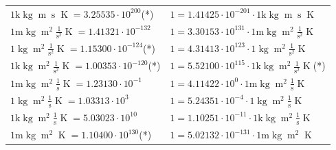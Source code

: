 \begin{center}
\begin{longtable}{l l}
{\color{gray}$1 \bm{\mathrm{ k}}\operatorname{kg}{\operatorname{m}}{\operatorname{s}}{}{\operatorname{K}} = 3.25535\cdot10^{200} $}\quad(*) & {\color{gray}$ 1 = 1.41425\cdot10^{-201} \cdot 1 \bm{\mathrm{ k}}\operatorname{kg}{\operatorname{m}}{\operatorname{s}}{}{\operatorname{K}}$}  \\
{\color{gray}$1 \bm{\mathrm{ m}}\operatorname{kg}{\operatorname{m}^2}\frac1{\operatorname{s}^2}{}{\operatorname{K}} = 1.41321\cdot10^{-132} $}   & {\color{gray}$ 1 = 3.30153\cdot10^{131} \cdot 1 \bm{\mathrm{ m}}\operatorname{kg}{\operatorname{m}^2}\frac1{\operatorname{s}^2}{}{\operatorname{K}}$}  \\
{\color{black}$1 \bm{\mathrm{ }}\operatorname{kg}{\operatorname{m}^2}\frac1{\operatorname{s}^2}{}{\operatorname{K}} = 1.15300\cdot10^{-124} $}\quad(*) & {\color{black}$ 1 = 4.31413\cdot10^{123} \cdot 1 \bm{\mathrm{ }}\operatorname{kg}{\operatorname{m}^2}\frac1{\operatorname{s}^2}{}{\operatorname{K}}$}  \\
{\color{gray}$1 \bm{\mathrm{ k}}\operatorname{kg}{\operatorname{m}^2}\frac1{\operatorname{s}^2}{}{\operatorname{K}} = 1.00353\cdot10^{-120} $}\quad(*) & {\color{gray}$ 1 = 5.52100\cdot10^{115} \cdot 1 \bm{\mathrm{ k}}\operatorname{kg}{\operatorname{m}^2}\frac1{\operatorname{s}^2}{}{\operatorname{K}}$}\quad(*)\\
{\color{gray}$1 \bm{\mathrm{ m}}\operatorname{kg}{\operatorname{m}^2}\frac1{\operatorname{s}}{}{\operatorname{K}} = 1.23130\cdot10^{-1} $}   & {\color{gray}$ 1 = 4.11422\cdot10^{0} \cdot 1 \bm{\mathrm{ m}}\operatorname{kg}{\operatorname{m}^2}\frac1{\operatorname{s}}{}{\operatorname{K}}$}  \\
{\color{black}$1 \bm{\mathrm{ }}\operatorname{kg}{\operatorname{m}^2}\frac1{\operatorname{s}}{}{\operatorname{K}} = 1.03313\cdot10^{3} $}   & {\color{black}$ 1 = 5.24351\cdot10^{-4} \cdot 1 \bm{\mathrm{ }}\operatorname{kg}{\operatorname{m}^2}\frac1{\operatorname{s}}{}{\operatorname{K}}$}  \\
{\color{gray}$1 \bm{\mathrm{ k}}\operatorname{kg}{\operatorname{m}^2}\frac1{\operatorname{s}}{}{\operatorname{K}} = 5.03023\cdot10^{10} $}   & {\color{gray}$ 1 = 1.10251\cdot10^{-11} \cdot 1 \bm{\mathrm{ k}}\operatorname{kg}{\operatorname{m}^2}\frac1{\operatorname{s}}{}{\operatorname{K}}$}  \\
{\color{gray}$1 \bm{\mathrm{ m}}\operatorname{kg}{\operatorname{m}^2}{}{}{\operatorname{K}} = 1.10400\cdot10^{130} $}\quad(*) & {\color{gray}$ 1 = 5.02132\cdot10^{-131} \cdot 1 \bm{\mathrm{ m}}\operatorname{kg}{\operatorname{m}^2}{}{}{\operatorname{K}}$}  \\

\end{longtable}
\end{center}
